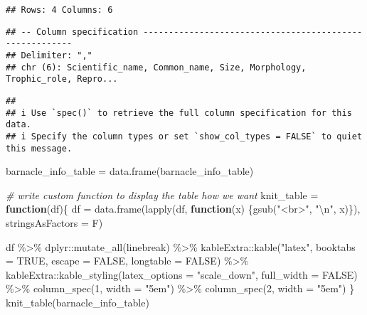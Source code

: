 \documentclass[
]{article}
\newenvironment{Shaded}{\begin{snugshade}}{\end{snugshade}}
\newcommand{\AttributeTok}[1]{\textcolor[rgb]{0.77,0.63,0.00}{#1}}
\newcommand{\CommentTok}[1]{\textcolor[rgb]{0.56,0.35,0.01}{\textit{#1}}}
\newcommand{\ConstantTok}[1]{\textcolor[rgb]{0.00,0.00,0.00}{#1}}
\newcommand{\ControlFlowTok}[1]{\textcolor[rgb]{0.13,0.29,0.53}{\textbf{#1}}}
\newcommand{\DecValTok}[1]{\textcolor[rgb]{0.00,0.00,0.81}{#1}}
\newcommand{\FunctionTok}[1]{\textcolor[rgb]{0.00,0.00,0.00}{#1}}
\newcommand{\NormalTok}[1]{#1}
\newcommand{\OtherTok}[1]{\textcolor[rgb]{0.56,0.35,0.01}{#1}}
\newcommand{\SpecialCharTok}[1]{\textcolor[rgb]{0.00,0.00,0.00}{#1}}
\newcommand{\StringTok}[1]{\textcolor[rgb]{0.31,0.60,0.02}{#1}}
\begin{document}
\begin{verbatim}
## Rows: 4 Columns: 6
\end{verbatim}

\begin{verbatim}
## -- Column specification --------------------------------------------------------
## Delimiter: ","
## chr (6): Scientific_name, Common_name, Size, Morphology, Trophic_role, Repro...
\end{verbatim}

\begin{verbatim}
## 
## i Use `spec()` to retrieve the full column specification for this data.
## i Specify the column types or set `show_col_types = FALSE` to quiet this message.
\end{verbatim}

\begin{Shaded}
\begin{Highlighting}[]
\NormalTok{barnacle\_info\_table }\OtherTok{=} \FunctionTok{data.frame}\NormalTok{(barnacle\_info\_table)}

\CommentTok{\# write custom function to display the table how we want}
\NormalTok{ knit\_table }\OtherTok{=} \ControlFlowTok{function}\NormalTok{(df)\{}
\NormalTok{     df }\OtherTok{=} \FunctionTok{data.frame}\NormalTok{(}\FunctionTok{lapply}\NormalTok{(df, }\ControlFlowTok{function}\NormalTok{(x) \{}\FunctionTok{gsub}\NormalTok{(}\StringTok{"\textless{}br\textgreater{}"}\NormalTok{, }\StringTok{"}\SpecialCharTok{\textbackslash{}n}\StringTok{"}\NormalTok{, x)\}), }\AttributeTok{stringsAsFactors =}\NormalTok{ F)}
 
\NormalTok{       df }\SpecialCharTok{\%\textgreater{}\%} 
\NormalTok{     dplyr}\SpecialCharTok{::}\FunctionTok{mutate\_all}\NormalTok{(linebreak) }\SpecialCharTok{\%\textgreater{}\%} 
\NormalTok{     kableExtra}\SpecialCharTok{::}\FunctionTok{kable}\NormalTok{(}\StringTok{"latex"}\NormalTok{, }
           \AttributeTok{booktabs =} \ConstantTok{TRUE}\NormalTok{, }
           \AttributeTok{escape =} \ConstantTok{FALSE}\NormalTok{, }
           \AttributeTok{longtable =} \ConstantTok{FALSE}\NormalTok{) }\SpecialCharTok{\%\textgreater{}\%} 
\NormalTok{     kableExtra}\SpecialCharTok{::}\FunctionTok{kable\_styling}\NormalTok{(}\AttributeTok{latex\_options =} \StringTok{"scale\_down"}\NormalTok{, }
                   \AttributeTok{full\_width =} \ConstantTok{FALSE}\NormalTok{)  }\SpecialCharTok{\%\textgreater{}\%} 
     \FunctionTok{column\_spec}\NormalTok{(}\DecValTok{1}\NormalTok{, }\AttributeTok{width =} \StringTok{"5em"}\NormalTok{) }\SpecialCharTok{\%\textgreater{}\%} 
     \FunctionTok{column\_spec}\NormalTok{(}\DecValTok{2}\NormalTok{, }\AttributeTok{width =} \StringTok{"5em"}\NormalTok{)}
\NormalTok{ \}}
 \FunctionTok{knit\_table}\NormalTok{(barnacle\_info\_table)}
\end{Highlighting}
\end{Shaded}
\end{document}
